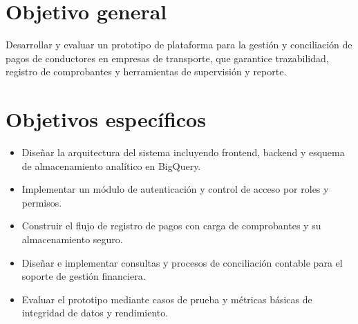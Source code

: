 
\section{Objetivo general}

Desarrollar y evaluar un prototipo de plataforma para la gestión y conciliación de pagos de conductores en empresas de transporte, que garantice trazabilidad, registro de comprobantes y herramientas de supervisión y reporte.

\section{Objetivos específicos}
\begin{itemize}
  \item Diseñar la arquitectura del sistema incluyendo frontend, backend y esquema de almacenamiento analítico en BigQuery.
  \item Implementar un módulo de autenticación y control de acceso por roles y permisos.
  \item Construir el flujo de registro de pagos con carga de comprobantes y su almacenamiento seguro.
  \item Diseñar e implementar consultas y procesos de conciliación contable para el soporte de gestión financiera.
  \item Evaluar el prototipo mediante casos de prueba y métricas básicas de integridad de datos y rendimiento.
\end{itemize}